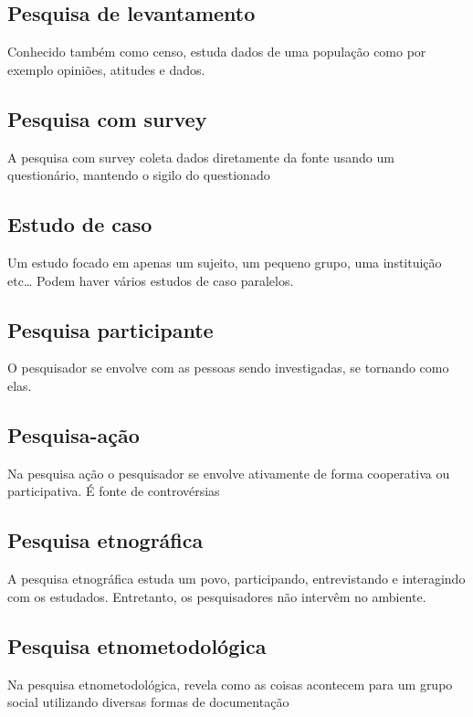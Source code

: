 \subsection{Pesquisa de levantamento}
Conhecido também como censo, estuda dados de uma população como por exemplo opiniões, atitudes e dados.

\subsection{Pesquisa com survey}
A pesquisa com survey coleta dados diretamente da fonte usando um questionário, mantendo o sigilo do questionado

\subsection{Estudo de caso}
Um estudo focado em apenas um sujeito, um pequeno grupo, uma instituição etc… Podem haver vários estudos de caso paralelos.

\subsection{Pesquisa participante}
O pesquisador se envolve com as pessoas sendo investigadas, se tornando como elas.

\subsection{Pesquisa-ação}
Na pesquisa ação o pesquisador se envolve ativamente de forma cooperativa ou participativa. É fonte de controvérsias

\subsection{Pesquisa etnográfica}
A pesquisa etnográfica estuda um povo, participando, entrevistando e interagindo com os estudados. Entretanto, os pesquisadores não intervêm no ambiente.

\subsection{Pesquisa etnometodológica}
Na pesquisa etnometodológica, revela como as coisas acontecem para um grupo social utilizando diversas formas de documentação
